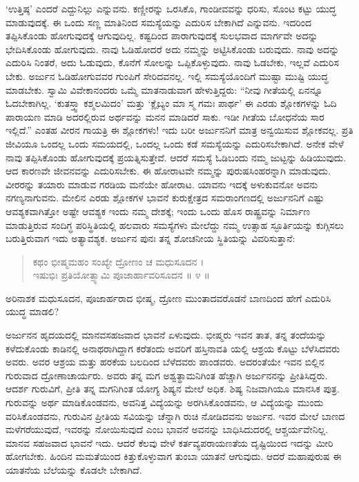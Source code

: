 ‘ಉತ್ತಿಷ್ಠ’ ಎಂದರೆ ಎದ್ದುನಿಲ್ಲು ಎನ್ನುವನು. ಕಣ್ಣೀರನ್ನು ಒರಸಿಕೊ, ಗಾಂಡೀವವನ್ನು ಧರಿಸು, ಸೊಂಟ ಕಟ್ಟು ಯುದ್ಧ ಮಾಡುವುದಕ್ಕೆ. ಈ ಒಂದು ಸಣ್ಣ ಮಾತಿನಿಂದ ಸಮಸ್ಯೆಯನ್ನು ಎದುರಿಸ ಬೇಕಾಗಿದೆ ಎನ್ನುವನು. ಇದರಿಂದ ತಪ್ಪಿಸಿಕೊಂಡು ಹೋಗುವುದಕ್ಕೆ ಆಗುವುದಿಲ್ಲ. ಕಷ್ಟದಿಂದ ಪಾರಾಗುವುದಕ್ಕೆ ಸುಲಭವಾದ ಮಾರ್ಗವೇ ಅದನ್ನು ಭೇದಿಸಿಕೊಂಡು ಹೋಗುವುದು. ನಾವು ಓಡಿಹೋದರೆ ಅದು ನಮ್ಮನ್ನು ಅಟ್ಟಿಸಿಕೊಂಡು ಬರುವುದು. ನಾವು ಅದನ್ನು ಎದುರಿಸಿ ನಿಂತರೆ, ಅದು ಓಡುವುದು, ಕೊನೆಗೆ ಸೋಲನ್ನು ಒಪ್ಪಿಕೊಳ್ಳುವುದು. ನಾವು ಓಡಬೇಕು, ಇಲ್ಲವೆ ಎದುರಿಸ ಬೇಕು. ಅರ್ಜುನ ಓಡಿಹೋಗುವವರ ಗುಂಪಿಗೆ ಸೇರಿದವನಲ್ಲ. ಇಲ್ಲಿ ಸಮಸ್ಯೆಯೊಂದಿಗೆ ಮುಷ್ಟಾ ಮುಷ್ಟಿ ಯುದ್ಧ ಮಾಡಬೇಕು. ಸ್ವಾಮಿ ವಿವೇಕಾನಂದರು ಒಮ್ಮೆ ಮಾತನಾಡುವಾಗ ಹೇಳುತ್ತಿದ್ದರು: “ನೀವು ಗೀತೆಯಲ್ಲಿ ಏನನ್ನೂ ಓದಬೇಕಾಗಿಲ್ಲ. ‘ಕುತಸ್ತ್ವಾ ಕಶ್ಮಲಮಿದಂ’ ಮತ್ತು ‘ಕ್ಲೈಬ್ಯಂ ಮಾ ಸ್ಮ ಗಮಃ ಪಾರ್ಥ’ ಈ ಎರಡು ಶ್ಲೋಕಗಳನ್ನು ಓದಿ ಪಾರಾಯಣ ಮಾಡಿ ಅದರಲ್ಲಿರುವ ಅರ್ಥವನ್ನು ಮನನ ಮಾಡಿದರೆ ಸಾಕು. ಇಡೀ ಗೀತೆಯ ಬೋಧನೆಯ ಸಾರ ಇಲ್ಲಿದೆ.” ಎಂತಹ ವೀರನ ಗಾಯತ್ರಿ ಈ ಶ್ಲೋಕಗಳು! ಇದು ಬರೀ ಅರ್ಜುನನಿಗೆ ಮಾತ್ರ ಅನ್ವಯಿಸುವ ಶ್ಲೋಕವಲ್ಲ. ಪ್ರತಿ ಜೀವಿಯೂ ಒಂದಲ್ಲ ಒಂದು ಸಮಯದಲ್ಲಿ, ಒಂದಲ್ಲ ಒಂದು ಕಡೆ ಸಮಸ್ಯೆಯನ್ನು ಎದುರಿಸಬೇಕಾಗಿದೆ. ಅನೇಕ ವೇಳೆ ನಾವು ತಪ್ಪಿಸಿಕೊಂಡು ಹೋಗುವುದಕ್ಕೆ ಪ್ರಯತ್ನಿಸುತ್ತೇವೆ. ಆದರೆ ಸಮಸ್ಯೆ ಓಡಿಬಂದು ನಮ್ಮ ಜುಟ್ಟನ್ನು ಹಿಡಿಯುವುದು. ಆದ ಕಾರಣವೇ ಜೀವನವನ್ನು ಎದುರಿಸಬೇಕು. ಈ ಹೋರಾಟವೇ ನಮ್ಮನ್ನು ಪುರುಷಸಿಂಹರನ್ನಾಗಿ ಮಾಡುವುದು. ವೀರರನ್ನು ತಯಾರು ಮಾಡುವ ಗರಡಿಯ ಮನೆಯೇ ಹೋರಾಟ. ಯಾವನು ಇದಕ್ಕೆ ಅಳುಕುವನೋ ಅವನು ನಗಣ್ಯನಾಗುವನು. ಮೇಲಿನ ಎರಡು ಶ್ಲೋಕಗಳ ಭಾವನೆ ಕುರುಕ್ಷೇತ್ರದ ಸಮರಾಂಗಣದಲ್ಲಿ ಅರ್ಜುನನಿಗೆ ಎಷ್ಟು ಆವಶ್ಯಕವಾಗಿತ್ತೋ ಅಷ್ಟೇ ಆವಶ್ಯಕ ಇಂದು ನಮ್ಮ ದೇಶಕ್ಕೆ; ಇಂದು ಒಂದು ಹೊಸ ರಾಷ್ಟ್ರವನ್ನು ನಿರ್ಮಾಣ ಮಾಡುತ್ತಿರುವ ಸಂದಿಗ್ಧ ಪರಿಸ್ಥಿತಿಯಲ್ಲಿ ಹಲವಾರು ಸಮಸ್ಯೆಗಳು ಮೇಲೆದ್ದು ನಮ್ಮ ಉತ್ಸಾಹ ಸ್ಫೂರ್ತಿಯನ್ನು ಕುಗ್ಗಿಸಲು ಬರುತ್ತಿರುವಾಗ ಇದು ಅತ್ಯಾವಶ್ಯಕ. ಅರ್ಜುನ ಪುನಃ ತನ್ನ ಶೋಚನೀಯ ಸ್ಥಿತಿಯನ್ನು ವಿವರಿಸುತ್ತಾನೆ:

\begin{verse}
ಕಥಂ ಭೀಷ್ಮಮಹಂ ಸಂಖ್ಯೇ ದ್ರೋಣಂ ಚ ಮಧುಸೂದನ ।\\ಇಷುಭಿಃ ಪ್ರತಿಯೋತ್ಸ್ಯಾಮಿ ಪೂಜಾರ್ಹಾವರಿಸೂದನ \num{॥ ೪ ॥}
\end{verse}

{\small ಅರಿನಾಶಕ ಮಧುಸೂದನ, ಪೂಜಾರ್ಹರಾದ ಭೀಷ್ಮ, ದ್ರೋಣ ಮುಂತಾದವರೊಡನೆ ಬಾಣದಿಂದ ಹೇಗೆ ಎದುರಿಸಿ ಯುದ್ಧ ಮಾಡಲಿ?}

ಅರ್ಜುನನ ಹೃದಯದಲ್ಲಿ ಮಾನವಸಹಜವಾದ ಭಾವನೆ ಏಳುವುದು. ಭೀಷ್ಮರು ಇವನ ತಾತ, ತನ್ನ ತಂದೆಯನ್ನು ಕಳೆದುಕೊಂಡು ಕಾಡಿನಲ್ಲಿ ಅನಾಥರಾಗಿದ್ದಾಗ ಕರೆತಂದು ಅವರಿಗೆ ಹಸ್ತಿನಾವತಿ ಯಲ್ಲಿ ಆಶ್ರಯ ಕೊಟ್ಟು ಬೆಳೆಸಿದವರು ಅವರು. ಅವರ ಆಶ್ರಯ ಮತ್ತು ಹರಕೆಯ ಬಲದಿಂದ ಬೆಳೆದವರು ಪಾಂಡವರು. ಅದರಂತೆಯೇ ಇವನ ಬಿಲ್ಲಿನ ಗುರುವಾದ ದ್ರೋಣಾಚಾರ್ಯರು. ಅವರು ತನ್ನ ಮಗ ಅಶ್ವತ್ಥಾಮನಿಗಿಂತ ಹೆಚ್ಚಾಗಿ ಅರ್ಜುನನನ್ನು ಪ್ರೀತಿಸಿದ್ದರು. ಆದರ್ಶ ಗುರುವಿಗೆ, ಪ್ರೀತಿ ತನ್ನ ಮಗನಿಗಿಂತ ಯೋಗ್ಯ ಶಿಷ್ಯನ ಮೇಲೆ ಅಧಿಕ. ಶಿಷ್ಯ ನಿಜವಾಗಿಯೂ ಮಾನಸಿಕ ಪುತ್ರ. ಗುರುವನ್ನು ಅರ್ಥ ಮಾಡಿಕೊಂಡವನು, ಅವನಿತ್ತ ವಿದ್ಯೆಯನ್ನು ಅರಗಿಸಿಕೊಂಡವನು, ಆ ವಿದ್ಯೆಯನ್ನು ಮುಂದು ವರಿಸಿಕೊಂಡವನು, ಗುರುವಿನ ಪ್ರೀತಿಯ ಸವಿಯನ್ನು ಚೆನ್ನಾಗಿ ರುಚಿ ನೋಡಿದವನು ಅರ್ಜುನ. ಇವರ ಮೇಲೆ ಬಾಣದ ಮಳೆಗರೆಯುವುದೆ, ಇವರನ್ನು ನೋಯಿಸುವುದೆ ಎಂಬ ಭಾವನೆ ಅವನನ್ನು ಬಾಧಿಸಿದುದರಲ್ಲಿ ಆಶ್ಚರ್ಯವೇನಿಲ್ಲ. ಮಾನವ ಸಹಜವಾದ ಭಾವನೆ ಇದು. ಆದರೆ ಕೆಲವು ವೇಳೆ ಕರ್ತವ್ಯಪರಾಯಣತೆಯ ದೃಷ್ಟಿಯಿಂದ ಇದನ್ನು ಮೀರಿ ಹೋಗಬೇಕು. ಹಿಂದಿನ ಮಮತೆಯಿಂದ ಕಿತ್ತುಕೊಳ್ಳುವಾಗ ತುಂಬಾ ಯಾತನೆ ಆಗುವುದು. ಆದರೆ ಮಹಾಪುರುಷ ಈ ಯಾತನೆಯ ಬೆಲೆಯನ್ನು ಕೊಡಲೇ ಬೇಕಾಗಿದೆ.

